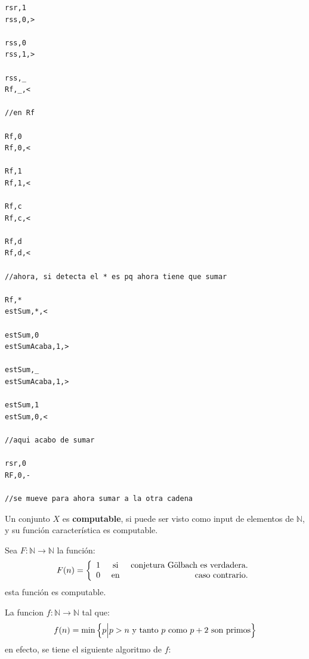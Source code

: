 \documentclass[12pt]{report}
\newcounter{it}
\theoremstyle{largebreak}
\newcommand\cf[3]{\ensuremath{#1:#2\rightarrow#3}}
\begin{document}
\begin{lstlisting}
rsr,1
rss,0,>

rss,0
rss,1,>

rss,_
Rf,_,<

//en Rf

Rf,0
Rf,0,<

Rf,1
Rf,1,<

Rf,c
Rf,c,<

Rf,d
Rf,d,<

//ahora, si detecta el * es pq ahora tiene que sumar

Rf,*
estSum,*,<

estSum,0
estSumAcaba,1,>

estSum,_
estSumAcaba,1,>

estSum,1
estSum,0,<

//aqui acabo de sumar

rsr,0
RF,0,-

//se mueve para ahora sumar a la otra cadena    
    \end{lstlisting}

    \begin{mydef}
        Un conjunto $X$ es \textbf{computable}, si puede ser visto como input de elementos de $\mathbb{N}$, y su función característica es computable.
    \end{mydef}
    
    \begin{exa}
        Sea $\cf{F}{\mathbb{N}}{\mathbb{N}}$ la función:
        \begin{equation*}
            F(n)=\left\{
                \begin{array}{lcr}
                    1 & \textup{si} & \textup{conjetura Gölbach es verdadera.}\\
                    0 & \textup{ en } & \textup{caso contrario.}\\
                \end{array}
            \right.
        \end{equation*}
        esta función es computable.
    \end{exa}

    \begin{exa}
        La funcion $\cf{f}{\mathbb{N}}{\mathbb{N}}$ tal que:
        \begin{equation*}
            f(n)=\min\left\{p\Big|p>n\textup{ y tanto }p\textup{ como }p+2\textup{ son primos}\right\}
        \end{equation*}
        en efecto, se tiene el siguiente algoritmo de $f$:
    \end{exa}
\end{document}
